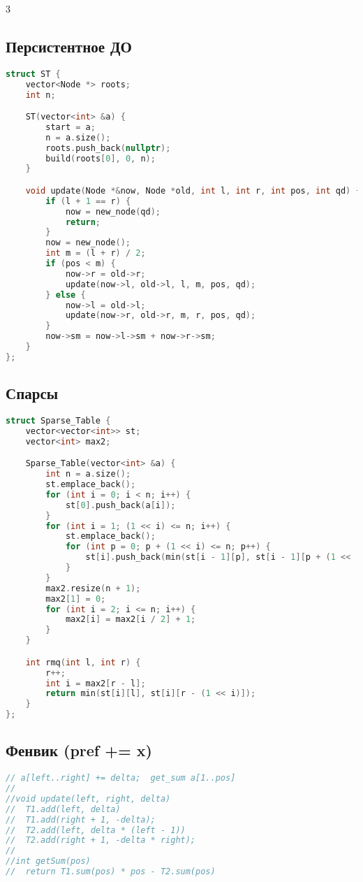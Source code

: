 \documentclass[10pt,a4paper,landscape,twosided]{extarticle}
\begin{document}
\begin{multicols}{3}
\subsection{Персистентное ДО}
\begin{lstlisting}[language=C++]
struct ST {
    vector<Node *> roots;
    int n;

    ST(vector<int> &a) {
        start = a;
        n = a.size();
        roots.push_back(nullptr);
        build(roots[0], 0, n);
    }

    void update(Node *&now, Node *old, int l, int r, int pos, int qd) {
        if (l + 1 == r) {
            now = new_node(qd);
            return;
        }
        now = new_node();
        int m = (l + r) / 2;
        if (pos < m) {
            now->r = old->r;
            update(now->l, old->l, l, m, pos, qd);
        } else {
            now->l = old->l;
            update(now->r, old->r, m, r, pos, qd);
        }
        now->sm = now->l->sm + now->r->sm;
    }
};

\end{lstlisting}

\subsection{Спарсы}
\begin{lstlisting}[language=C++]
struct Sparse_Table {
    vector<vector<int>> st;
    vector<int> max2;

    Sparse_Table(vector<int> &a) {
        int n = a.size();
        st.emplace_back();
        for (int i = 0; i < n; i++) {
            st[0].push_back(a[i]);
        }
        for (int i = 1; (1 << i) <= n; i++) {
            st.emplace_back();
            for (int p = 0; p + (1 << i) <= n; p++) {
                st[i].push_back(min(st[i - 1][p], st[i - 1][p + (1 << (i - 1))]));
            }
        }
        max2.resize(n + 1);
        max2[1] = 0;
        for (int i = 2; i <= n; i++) {
            max2[i] = max2[i / 2] + 1;
        }
    }

    int rmq(int l, int r) {
        r++;
        int i = max2[r - l];
        return min(st[i][l], st[i][r - (1 << i)]);
    }
};

\end{lstlisting}

\subsection{Фенвик (pref += x)}
\begin{lstlisting}[language=C++]
// a[left..right] += delta;  get_sum a[1..pos]
//
//void update(left, right, delta)
//  T1.add(left, delta)
//  T1.add(right + 1, -delta);
//  T2.add(left, delta * (left - 1))
//  T2.add(right + 1, -delta * right);
//
//int getSum(pos)
//  return T1.sum(pos) * pos - T2.sum(pos)


\end{lstlisting}
\end{multicols}
\end{document}
